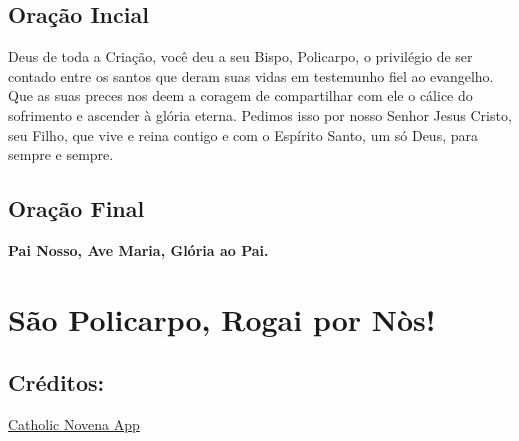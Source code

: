\documentclass[18pt]{article}
\begin{document}
\begin{justify}
\subsection{Oração Incial}\label{sec:Oração_Inicial} %



Deus de toda a Criação, você deu a seu Bispo, Policarpo, o privilégio de ser contado entre os santos que deram suas vidas em testemunho fiel ao evangelho. Que as suas preces nos deem a coragem de compartilhar com ele o cálice do sofrimento e ascender à glória eterna. Pedimos isso por nosso Senhor Jesus Cristo, seu Filho, que vive e reina contigo e com o Espírito Santo, um só Deus, para sempre e sempre.

\subsection{Oração Final}\label{sec:Oração_Final} %
\begin{center}
\textbf{Pai Nosso, Ave Maria, Glória ao Pai.}

\vfill
\section*{São Policarpo, Rogai por Nòs!}

\vfill
\subsection*{Créditos:}
\href{https://catholicnovenaapp.com/novenas/st-margaret-of-cortona-novena/#day-1-prayer}{Catholic Novena App}

\end{center}


\end{justify}
\end{document}
